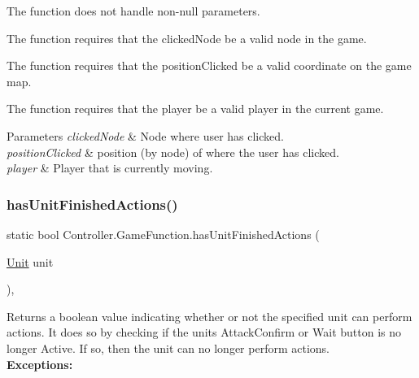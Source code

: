 \begin{DoxyItemize}
\item The function does not handle non-\/null parameters.
\item The function requires that the clicked\+Node be a valid node in the game.
\item The function requires that the position\+Clicked be a valid coordinate on the game map.
\item The function requires that the player be a valid player in the current game. 
\begin{DoxyParams}{Parameters}
{\em clicked\+Node} & Node where user has clicked. \\
\hline
{\em position\+Clicked} & position (by node) of where the user has clicked. \\
\hline
{\em player} & Player that is currently moving. \\
\hline
\end{DoxyParams}

\end{DoxyItemize}\hypertarget{class_controller_1_1_game_function_ac23bfd530d3a087da49065fce84821ab}{}\label{class_controller_1_1_game_function_ac23bfd530d3a087da49065fce84821ab} 
\subsubsection{\texorpdfstring{has\+Unit\+Finished\+Actions()}{hasUnitFinishedActions()}}
{\footnotesize\ttfamily static bool Controller.\+Game\+Function.\+has\+Unit\+Finished\+Actions (\begin{DoxyParamCaption}\item[{\hyperlink{interface_model_1_1_unit_module_1_1_unit}{Unit}}]{unit }\end{DoxyParamCaption})\hspace{0.3cm}{\ttfamily [inline]}, {\ttfamily [static]}}

Returns a boolean value indicating whether or not the specified unit can perform actions. It does so by checking if the unit\textquotesingle{}s Attack\+Confirm or Wait button is no longer Active. If so, then the unit can no longer perform actions. ~\newline
~\newline
 {\bfseries Exceptions\+:} ~\newline

